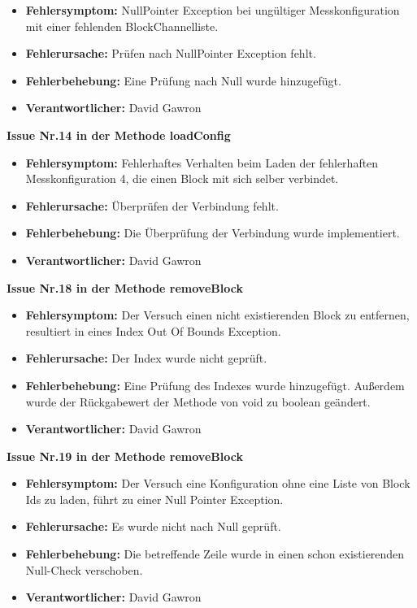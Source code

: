\documentclass[parskip=full]{scrartcl}
\begin{document}
\begin{description}
\begin{itemize}
\item []\textbf{Fehlersymptom:} NullPointer Exception bei ungültiger Messkonfiguration mit einer fehlenden BlockChannelliste.
\item []\textbf{Fehlerursache:} Prüfen nach NullPointer Exception fehlt.
\item []\textbf{Fehlerbehebung:} Eine Prüfung nach Null wurde hinzugefügt.
\item []\textbf{Verantwortlicher:} David Gawron
\end{itemize}


\item []\textbf{Issue Nr.14 in der Methode loadConfig} 

\begin{itemize}
\item []\textbf{Fehlersymptom:} Fehlerhaftes Verhalten beim Laden der fehlerhaften Messkonfiguration 4, die einen Block mit sich selber verbindet.
\item []\textbf{Fehlerursache:} Überprüfen der Verbindung fehlt.
\item []\textbf{Fehlerbehebung:} Die Überprüfung der Verbindung wurde implementiert.
\item []\textbf{Verantwortlicher:} David Gawron
\end{itemize}

\item []\textbf{Issue Nr.18 in der Methode removeBlock} 

\begin{itemize}
\item []\textbf{Fehlersymptom:} Der Versuch einen nicht existierenden Block zu entfernen, resultiert in eines Index Out Of Bounds Exception.
\item []\textbf{Fehlerursache:} Der Index wurde nicht geprüft.
\item []\textbf{Fehlerbehebung:} Eine Prüfung des Indexes wurde hinzugefügt. Außerdem wurde der Rückgabewert der Methode von void zu boolean geändert.
\item []\textbf{Verantwortlicher:} David Gawron
\end{itemize}

\item []\textbf{Issue Nr.19 in der Methode removeBlock} 

\begin{itemize}
\item []\textbf{Fehlersymptom:} Der Versuch eine Konfiguration ohne eine Liste von Block Ids zu laden, führt zu einer Null Pointer Exception.
\item []\textbf{Fehlerursache:} Es wurde nicht nach Null geprüft.
\item []\textbf{Fehlerbehebung:} Die betreffende Zeile wurde in einen schon existierenden Null-Check verschoben.
\item []\textbf{Verantwortlicher:} David Gawron
\end{itemize}


\end{description}
\end{document}
